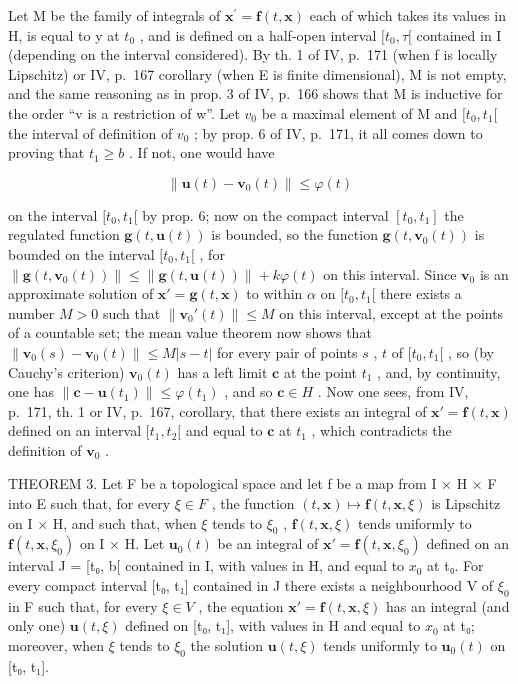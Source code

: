 Let M be the family of integrals of \(\mathbf{x}^{\prime} = \mathbf{f}(t, \mathbf{x})\) each of which takes its values in H, is equal to y at \(t_{0}\) , and is defined on a half-open interval \([t_{0}, \tau[\) contained in I (depending on the interval considered). By th. 1 of IV, p.~171 (when f is locally Lipschitz) or IV, p.~167 corollary (when E is finite dimensional), M is not empty, and the same reasoning as in prop. 3 of IV, p.~166 shows that M is inductive for the order ``v is a restriction of w''. Let \(v_{0}\) be a maximal element of M and \([t_{0}, t_{1}[\) the interval of definition of \(v_{0}\) ; by prop. 6 of IV, p.~171, it all comes down to proving that \(t_{1} \geqslant b\) . If not, one would have

\[
\left\| \mathbf {u} (t) - \mathbf {v} _ {0} (t) \right\| \leqslant \varphi (t)
\]

on the interval \([t_0, t_1[\) by prop. 6; now on the compact interval \([t_0, t_1]\) the regulated function \(\mathbf{g}(t, \mathbf{u}(t))\) is bounded, so the function \(\mathbf{g}(t, \mathbf{v}_0(t))\) is bounded on the interval \([t_0, t_1[\) , for \(\| \mathbf{g}(t, \mathbf{v}_0(t)) \| \leqslant \| \mathbf{g}(t, \mathbf{u}(t)) \| + k\varphi(t)\) on this interval. Since \(\mathbf{v}_0\) is an approximate solution of \(\mathbf{x}' = \mathbf{g}(t, \mathbf{x})\) to within \(\alpha\) on \([t_0, t_1[\) there exists a number \(M > 0\) such that \(\| \mathbf{v}_0'(t) \| \leqslant M\) on this interval, except at the points of a countable set; the mean value theorem now shows that \(\| \mathbf{v}_0(s) - \mathbf{v}_0(t) \| \leqslant M |s - t|\) for every pair of points \(s\) , \(t\) of \([t_0, t_1[\) , so (by Cauchy's criterion) \(\mathbf{v}_0(t)\) has a left limit \(\mathbf{c}\) at the point \(t_1\) , and, by continuity, one has \(\| \mathbf{c} - \mathbf{u}(t_1) \| \leqslant \varphi(t_1)\) , and so \(\mathbf{c} \in H\) . Now one sees, from IV, p.~171, th. 1 or IV, p.~167, corollary, that there exists an integral of \(\mathbf{x}' = \mathbf{f}(t, \mathbf{x})\) defined on an interval \([t_1, t_2[\) and equal to \(\mathbf{c}\) at \(t_1\) , which contradicts the definition of \(\mathbf{v}_0\) .

THEOREM 3. Let F be a topological space and let f be a map from I × H × F into E such that, for every \(\xi \in F\) , the function \((t, \mathbf{x}) \mapsto \mathbf{f}(t, \mathbf{x}, \xi)\) is Lipschitz on I × H, and such that, when \(\xi\) tends to \(\xi_{0}\) , \(\mathbf{f}(t, \mathbf{x}, \xi)\) tends uniformly to \(\mathbf{f}(t, \mathbf{x}, \xi_{0})\) on I × H. Let \(\mathbf{u}_{0}(t)\) be an integral of \(\mathbf{x}' = \mathbf{f}(t, \mathbf{x}, \xi_{0})\) defined on an interval J = {[}t₀, b{[} contained in I, with values in H, and equal to \(x_{0}\) at t₀. For every compact interval {[}t₀, t₁{]} contained in J there exists a neighbourhood V of \(\xi_{0}\) in F such that, for every \(\xi \in V\) , the equation \(\mathbf{x}' = \mathbf{f}(t, \mathbf{x}, \xi)\) has an integral (and only one) \(\mathbf{u}(t, \xi)\) defined on {[}t₀, t₁{]}, with values in H and equal to \(x_{0}\) at t₀; moreover, when \(\xi\) tends to \(\xi_{0}\) the solution \(\mathbf{u}(t, \xi)\) tends uniformly to \(\mathbf{u}_{0}(t)\) on {[}t₀, t₁{]}.

